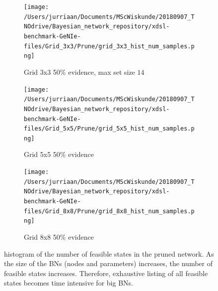 \documentclass[a4paper, twoside, 11pt]{report}
\theoremstyle{plain}
\theoremstyle{definition}
\theoremstyle{remark}
\begin{document}
\begin{figure}[h!]
\begin{subfigure}{.3\linewidth}
\texttt{[image: /Users/jurriaan/Documents/MScWiskunde/20180907\_TNOdrive/Bayesian\_network\_repository/xdsl-benchmark-GeNIe-files/Grid\_3x3/Prune/grid\_3x3\_hist\_num\_samples.png]}
\caption{Grid 3x3 50\% evidence, max set size $14$}%
\label{grid_3x3}%
\end{subfigure}\hfill%
\begin{subfigure}{.3\linewidth}
\texttt{[image: /Users/jurriaan/Documents/MScWiskunde/20180907\_TNOdrive/Bayesian\_network\_repository/xdsl-benchmark-GeNIe-files/Grid\_5x5/Prune/grid\_5x5\_hist\_num\_samples.png]}
\caption{Grid 5x5 50\% evidence}%
\label{grid_5x5, max set size $130$}%
\end{subfigure}\hfill%
\begin{subfigure}{.3\linewidth}
\texttt{[image: /Users/jurriaan/Documents/MScWiskunde/20180907\_TNOdrive/Bayesian\_network\_repository/xdsl-benchmark-GeNIe-files/Grid\_8x8/Prune/grid\_8x8\_hist\_num\_samples.png]}
\caption{Grid 8x8 50\% evidence}%
\label{grid_8x8}%
\end{subfigure}\hfill%

\vspace{0.75pc}
\caption{histogram of the number of feasible states in the pruned network. As the size of the BNs (nodes and parameters) increases, the number of feasible states increases. Therefore, exhaustive listing of all feasible states becomes time intensive for big BNs.}
\label{results1}
\end{figure}
\end{document}
